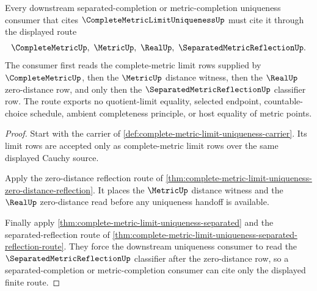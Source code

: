 \begin{theorem}
\label{thm:complete-metric-limit-uniqueness-downstream-link}
Every downstream separated-completion or metric-completion uniqueness consumer that cites $\CompleteMetricLimitUniquenessUp$ must cite it through the displayed route
$$
\CompleteMetricUp,\ \MetricUp,\ \RealUp,\ \SeparatedMetricReflectionUp .
$$
The consumer first reads the complete-metric limit rows supplied by $\CompleteMetricUp$, then the $\MetricUp$ distance witness, then the $\RealUp$ zero-distance row, and only then the $\SeparatedMetricReflectionUp$ classifier row. The route exports no quotient-limit equality, selected endpoint, countable-choice schedule, ambient completeness principle, or host equality of metric points.
\end{theorem}
\begin{proof}
Start with the carrier of \autoref{def:complete-metric-limit-uniqueness-carrier}. Its limit rows are accepted only as complete-metric limit rows over the same displayed Cauchy source.

Apply the zero-distance reflection route of \autoref{thm:complete-metric-limit-uniqueness-zero-distance-reflection}. It places the $\MetricUp$ distance witness and the $\RealUp$ zero-distance read before any uniqueness handoff is available.

Finally apply \autoref{thm:complete-metric-limit-uniqueness-separated} and the separated-reflection route of \autoref{thm:complete-metric-limit-uniqueness-separated-reflection-route}. They force the downstream uniqueness consumer to read the $\SeparatedMetricReflectionUp$ classifier after the zero-distance row, so a separated-completion or metric-completion consumer can cite only the displayed finite route.
\end{proof}

